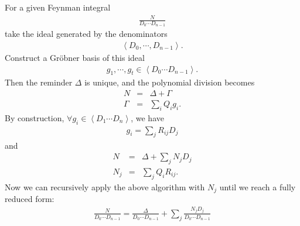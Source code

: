 \documentclass[10pt]{article}
\begin{document}
For a given Feynman integral
\begin{eqnarray} \nonumber
\frac{N}{D_0 \cdots D_{n-1}}
\end{eqnarray}
take the ideal generated by the denominators
\begin{eqnarray} \nonumber
\left< D_0, \cdots, D_{n-1} \right>.
\end{eqnarray}
Construct a Gr\"obner basis of this ideal
\begin{eqnarray} \nonumber
g_1, \cdots, g_t \in \left< D_0 \cdots D_{n-1} \right>.
\end{eqnarray}
Then the reminder $\Delta$ is unique, and the polynomial division becomes
\begin{eqnarray} \nonumber
N &=& \Delta+ \Gamma \\ \nonumber
\Gamma &=& \sum_i Q_i g_i.
\end{eqnarray}
By construction, $\forall g_i \in \left< D_1 \cdots D_n \right>$, we have
\begin{eqnarray} \nonumber
g_i = \sum_j R_{ij} D_j
\end{eqnarray}
and
\begin{eqnarray} \nonumber
N &=& \Delta + \sum_j N_j D_j \\\nonumber
N_j &=& \sum_j Q_i R_{ij}.
\end{eqnarray}
Now we can recursively apply the above algorithm with $N_j$ until we reach a fully reduced form:
\begin{eqnarray} \nonumber
\frac{N}{D_0 \cdots D_{n-1}}
=
\frac{\Delta}{D_0 \cdots D_{n-1}}
+
\sum_j \frac{ N_j D_j}{D_0 \cdots D_{n-1}}
\end{eqnarray}
\end{document}
